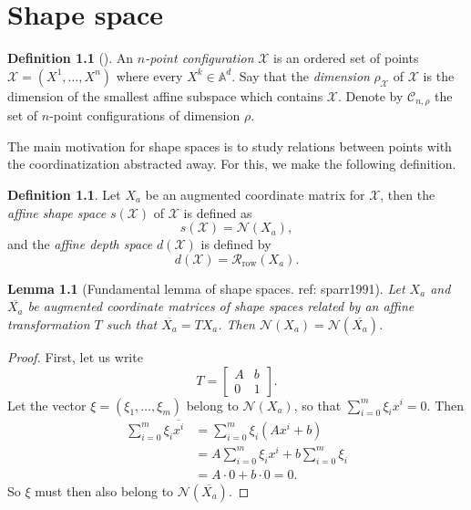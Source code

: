 \documentclass[a4paper,12pt]{book}
\theoremstyle{plain}
\newtheorem{Lemma}[equation]{Lemma}
\theoremstyle{definition}
\newtheorem{defi}[equation]{Definition}
\begin{document}
\chapter{Shape space} %
\label{sec:shape_space}
\begin{defi}[\cite{sparr1998}]
	An \emph{\( n \)-point configuration} \( \mathcal{X}  \) is an ordered set of points
	\( \mathcal{X} = (X^1, \ldots, X^n) \) where every \( X^k \in \mathbb{A}^d \).
	Say that the \emph{dimension} \( \rho_\mathcal{X} \) of \( \mathcal{X} \) is the dimension of
	the smallest affine subspace which contains \( \mathcal{X}  \).
	Denote by \( \mathcal{C}_{n,\rho} \) the set of \( n \)-point configurations of dimension
	\( \rho \).
\end{defi}
The main motivation for shape spaces is to study relations between points with the coordinatization
abstracted away. For this, we make the following definition.
\begin{defi}
	Let \( X_a \) be an augmented coordinate matrix for \( \mathcal{X} \), then the \emph{affine
	shape space} \( s(\mathcal{X}) \) of \( \mathcal{X} \) is defined as
	\[
		s(\mathcal{X}) = \mathcal{N}(X_a),
	\]
	and the \emph{affine depth space} \( d(\mathcal{X}) \) is defined by
	\[
		d(\mathcal{X}) = \mathcal{R}_\text{row}(X_a).
	\]
\end{defi}
\begin{Lemma}[Fundamental lemma of shape spaces. ref: sparr1991]
	Let \( X_a \) and \( \overline{X_a} \) be augmented coordinate matrices of shape spaces
	related by an affine transformation \( T \) such that \( \overline{X_a} = T X_a \).
	Then \( \mathcal{N}(X_a) = \mathcal{N}(\overline{X_a}) \).
\end{Lemma}
\begin{proof}
	First, let us write \[
		T = \begin{bmatrix}
			A & b \\ 0 & 1
		\end{bmatrix}.
	\]
	Let the vector \( \xi = (\xi_1, \ldots, \xi_m) \) belong to \( \mathcal{N}(X_a) \), so that
	\( \sum_{i=0}^m \xi_i x^i = 0 \). Then
	\begin{align*}
		\sum_{i=0}^m \xi_i \overline{x^i} & = \sum_{i=0}^m \xi_i (A x^i + b) \\
		& = A \sum_{i = 0}^m \xi_i x^i + b \sum_{i = 0}^m \xi_i \\
		& = A \cdot 0 + b \cdot 0 = 0.
	\end{align*}
	So \( \xi \) must then also belong to \( \mathcal{N}(\overline{X_a}) \).
\end{proof}
\end{document}
